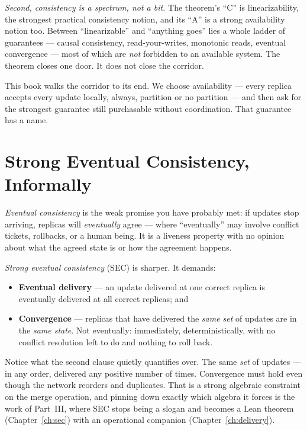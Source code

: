 \documentclass[12pt, a4paper, openright]{book}
\theoremstyle{thmstyle}
\theoremstyle{defstyle}
\begin{document}
\emph{Second, consistency is a spectrum, not a bit.} The theorem's
``C'' is linearizability, the strongest practical consistency notion,
and its ``A'' is a strong availability notion too. Between
``linearizable'' and ``anything goes'' lies a whole ladder of
guarantees --- causal consistency, read-your-writes, monotonic reads,
eventual convergence --- most of which are \emph{not} forbidden to an
available system. The theorem closes one door. It does not close the
corridor.

This book walks the corridor to its end. We choose availability ---
every replica accepts every update locally, always, partition or no
partition --- and then ask for the strongest guarantee still purchasable
without coordination. That guarantee has a name.

\section{Strong Eventual Consistency, Informally}

\emph{Eventual consistency} is the weak promise you have probably met:
if updates stop arriving, replicas will \emph{eventually} agree ---
where ``eventually'' may involve conflict tickets, rollbacks, or a human
being. It is a liveness property with no opinion about what the agreed
state is or how the agreement happens.

\emph{Strong eventual consistency} (SEC) is sharper. It demands:

\begin{itemize}
  \item \textbf{Eventual delivery} --- an update delivered at one correct
    replica is eventually delivered at all correct replicas; and
  \item \textbf{Convergence} --- replicas that have delivered the
    \emph{same set} of updates are in the \emph{same state}. Not
    eventually: immediately, deterministically, with no conflict
    resolution left to do and nothing to roll back.
\end{itemize}

Notice what the second clause quietly quantifies over. The same
\emph{set} of updates --- in any order, delivered any positive number of
times. Convergence must hold even though the network reorders and
duplicates. That is a strong algebraic constraint on the merge
operation, and pinning down exactly which algebra it forces is the work
of Part~III, where SEC stops being a slogan and becomes a Lean theorem
(Chapter~\ref{ch:sec}) with an operational companion
(Chapter~\ref{ch:delivery}).
\end{document}
